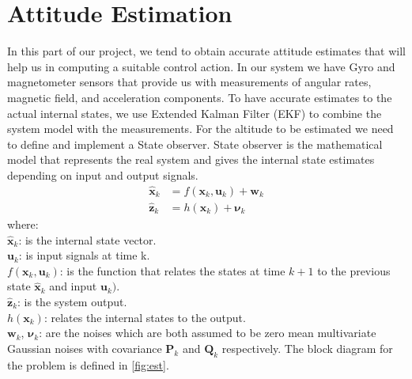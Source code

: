 \section{Attitude Estimation}
In this part of our project, we tend to obtain accurate attitude estimates that will help us in computing a suitable control action. In our system we have Gyro and magnetometer sensors that provide us with measurements of angular rates, magnetic field, and acceleration components. To have accurate estimates to the actual internal states, we use Extended Kalman Filter (EKF) to combine the system model with the measurements. For the altitude to be estimated we need to define and implement a State observer. State observer is the mathematical model that represents the real system and gives the internal state estimates depending on input and output signals.  
\begin{align}
    \mathbf{\hat{x}}_k &= f(\mathbf{x}_k, \mathbf{u}_k) + \mathbf{w}_k \\
    \mathbf{\hat{z}}_k &= h(\mathbf{x}_k) + \boldsymbol{\nu}_k
\end{align}
where: \\
$\mathbf{\hat{x}}_k$: is the internal state vector.\\
$\mathbf{u}_k$:  is input signals at time k.\\
$f(\mathbf{x}_k, \mathbf{u}_k)$: is the function that relates the states at time $k + 1$ to the previous state $\mathbf{\hat{x}}_k$ and input $\mathbf{u}_k)$. \\
$\mathbf{\hat{z}}_k$: is the system output.\\
$ h(\mathbf{x}_k)$: relates the internal states to the output.\\
$\mathbf{w}_k$, $\boldsymbol{\nu}_k$: are the noises which are both assumed to be zero mean multivariate Gaussian noises with covariance $\mathbf{P}_k$ and $\mathbf{Q}_k$ respectively. 
The block diagram for the problem is defined in \ref{fig:est}.

